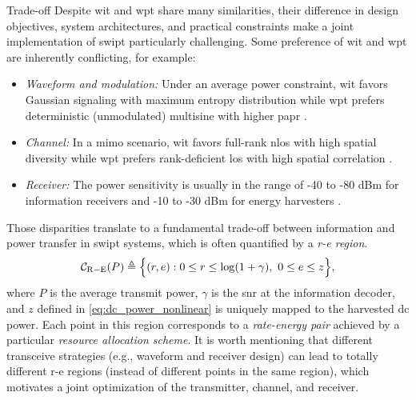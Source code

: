\begin{section}{}
	\begin{subsection}{ Trade-off}
		Despite \gls{wit} and \gls{wpt} share many similarities, their difference in design objectives, system architectures, and practical constraints make a joint implementation of \gls{swipt} particularly challenging.
		Some preference of \gls{wit} and \gls{wpt} are inherently conflicting, for example:
		\begin{itemize}
			\item \emph{Waveform and modulation:} Under an average power constraint, \gls{wit} favors Gaussian signaling with maximum entropy distribution \cite{Cover2005} while \gls{wpt} prefers deterministic (unmodulated) multisine with higher \gls{papr} \cite{Trotter2009}.
			\item \emph{Channel:} In a \gls{mimo} scenario, \gls{wit} favors full-rank \gls{nlos} with high spatial diversity while \gls{wpt} prefers rank-deficient \gls{los} with high spatial correlation \cite{Wu2022a}.
			\item \emph{Receiver:} The power sensitivity is usually in the range of -40 to -80 dBm for information receivers and -10 to -30 dBm for energy harvesters \cite{Lu2015}.
		\end{itemize}
		Those disparities translate to a fundamental trade-off between information and power transfer in \gls{swipt} systems, which is often quantified by a \emph{\gls{r-e} region}.
		\begin{equation}
			\mathcal{C}_\mathrm{R-E}(P) \triangleq \Bigl\{ (r,e) : 0 \le r \le \log(1 + \gamma), \ 0 \le e \le z \Bigr\},
		\end{equation}
		where $P$ is the average transmit power, $\gamma$ is the \gls{snr} at the information decoder, and $z$ defined in \eqref{eq:dc_power_nonlinear} is uniquely mapped to the harvested \gls{dc} power.
		Each point in this region corresponds to a \emph{rate-energy pair} achieved by a particular \emph{resource allocation scheme}.
		It is worth mentioning that different transceive strategies (e.g., waveform and receiver design) can lead to totally different \gls{r-e} regions (instead of different points in the same region), which motivates a joint optimization of the transmitter, channel, and receiver.
	\end{subsection}


\end{section}

